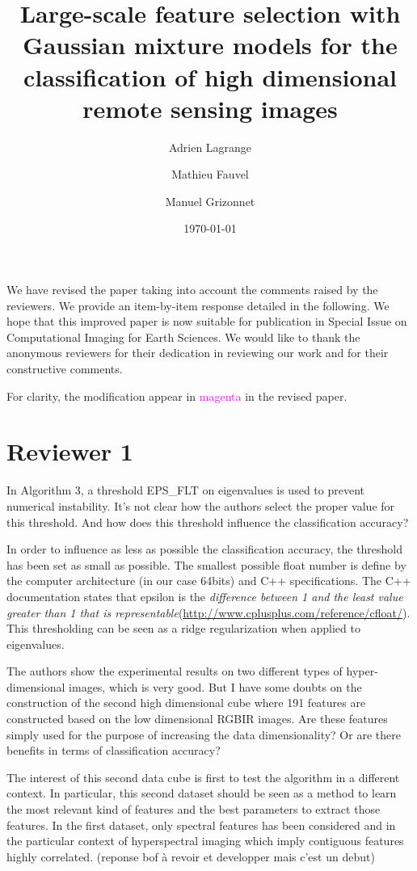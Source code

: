 \documentclass[a4paper,10pt,DIV=16]{scrartcl}
\title{Large-scale feature selection with Gaussian mixture models for the classification of high dimensional remote sensing images}
\date{\today}
\author{Adrien Lagrange \and Mathieu Fauvel \and Manuel Grizonnet}
\begin{document}
\maketitle

We have revised  the paper taking into account the  comments raised by
the reviewers.   We provide an  item-by-item response detailed  in the
following.   We hope  that this  improved  paper is  now suitable  for
publication  in  {\sc  Special Issue on Computational Imaging for Earth Sciences}.   We would  like  to  thank  the
anonymous reviewers for their dedication in reviewing our work and for
their constructive comments.

For clarity,  the modification appear  in \textcolor{magenta}{magenta}
in the revised paper.


\section{Reviewer 1}

\begin{revbox}
In Algorithm 3, a threshold EPS\_FLT on eigenvalues is used to prevent numerical instability. It’s not clear how the authors select the proper value for this threshold. And how does this threshold influence the classification accuracy?

  \begin{resbox}
    In order to influence as less as possible the classification accuracy, the threshold has been set as small as possible. The smallest possible float number is define by the computer architecture (in our case 64bits) and C++ specifications. The C++ documentation states that epsilon is the \emph{difference between 1 and the least value greater than 1 that is representable}(\url{http://www.cplusplus.com/reference/cfloat/}).
    This thresholding can be seen as a ridge regularization when applied to eigenvalues. 
  \end{resbox}

\end{revbox}

\begin{revbox}
  The authors show the experimental results on two different types of hyper-dimensional images, which is very good. But I have some doubts on the construction of the second high dimensional cube where 191 features are constructed based on the low dimensional RGBIR images. Are these features simply used for the purpose of increasing the data dimensionality? Or are there benefits in terms of classification accuracy?
  \begin{resbox}
    The interest of this second data cube is first to test the algorithm in a different context. In particular, this second dataset should be seen as a method to learn the most relevant kind of features and the best parameters to extract those features. In the first dataset, only spectral features has been considered and in the particular context of hyperspectral imaging which imply contiguous features highly correlated.
    (reponse bof à revoir et developper mais c'est un debut)
  \end{resbox}
\end{revbox}
\end{document}
